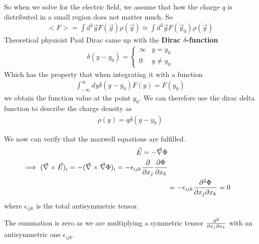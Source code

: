 So when we solve for the electric field, we assume that how the charge $q$ is distributed in a small region does not matter much. So
\begin{align*}
  <F> = \int d^{3} \vec{y} F(\vec{y}) \rho(\vec{y}) \simeq \int d^{3}\vec{y} F(\vec{y}_0) \rho(\vec{y})
\end{align*}
Theoretical physicist Paul Dirac came up with the \textbf{Dirac $\delta$-function}
\begin{align*}
  \delta(y - y_0) = \left\{\begin{array}{ll}
    \infty & y = y_0\\
    0 & y \neq y_0 
  \end{array} \right.
\end{align*}
Which has the property that when integrating it with a function
\begin{align*}
  \int_{-\infty}^{\infty}dy \delta(y - y_0) F(y) = F(y_0)
\end{align*}
we obtain the function value at the point $y_0$.
We can therefore use the dirac delta function to describe the charge density as 
\begin{align*}
  \rho(y) = q \delta(y - y_0)
\end{align*}

We now can verify that the maxwell equations are fulfilled.
\begin{align*}
  \vec{E} = - \vec{\nabla} \Phi\\
  \implies (\vec{\nabla}\times \vec{E})_i = - (\vec{\nabla} \times \vec{\nabla} \Phi)_i = - \epsilon_{ijk} \frac{\partial }{\partial x_j} \frac{\partial \Phi}{\partial x_k}\\
  &= - \epsilon_{ijk} \frac{\partial^2 \Phi}{\partial x_j \partial x_k} = 0
\end{align*}
where $\epsilon_{ijk}$ is the total antisymmetric tensor.

The summation is zero as we are multiplying a symmetric tensor $\frac{\partial^2}{\partial x_j \partial x_k}$ with an antisymmetric one $\epsilon_{ijk}$.

